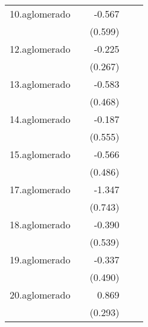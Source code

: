 {\begin{longtable}{l*{4}{D{.}{.}{-1}}}
\addlinespace
10.aglomerado&                     &      -0.567         &                     &                     \\
            &                     &     (0.599)         &                     &                     \\
\addlinespace
12.aglomerado&                     &      -0.225         &                     &                     \\
            &                     &     (0.267)         &                     &                     \\
\addlinespace
13.aglomerado&                     &      -0.583         &                     &                     \\
            &                     &     (0.468)         &                     &                     \\
\addlinespace
14.aglomerado&                     &      -0.187         &                     &                     \\
            &                     &     (0.555)         &                     &                     \\
\addlinespace
15.aglomerado&                     &      -0.566         &                     &                     \\
            &                     &     (0.486)         &                     &                     \\
\addlinespace
17.aglomerado&                     &      -1.347         &                     &                     \\
            &                     &     (0.743)         &                     &                     \\
\addlinespace
18.aglomerado&                     &      -0.390         &                     &                     \\
            &                     &     (0.539)         &                     &                     \\
\addlinespace
19.aglomerado&                     &      -0.337         &                     &                     \\
            &                     &     (0.490)         &                     &                     \\
\addlinespace
20.aglomerado&                     &       0.869\sym{**} &                     &                     \\
            &                     &     (0.293)         &                     &                     \\

\end{longtable}}
